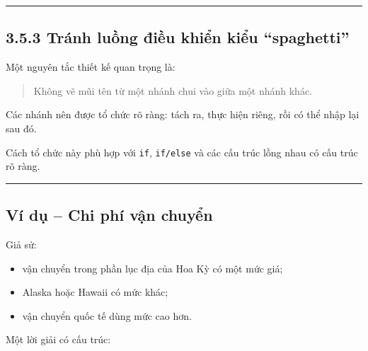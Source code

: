\documentclass[
  11pt,
  a4paper,
]{article}
\providecommand{\tightlist}{%
  \setlength{\itemsep}{0pt}\setlength{\parskip}{0pt}}
\begin{document}
\begin{center}\rule{0.5\linewidth}{0.5pt}\end{center}

\subsection{3.5.3 Tránh luồng điều khiển kiểu
``spaghetti''}\label{truxe1nh-luux1ed3ng-ux111iux1ec1u-khiux1ec3n-kiux1ec3u-spaghetti}

Một nguyên tắc thiết kế quan trọng là:

\begin{quote}
Không vẽ mũi tên từ một nhánh chui vào giữa một nhánh khác.
\end{quote}

Các nhánh nên được tổ chức rõ ràng: tách ra, thực hiện riêng, rồi có thể
nhập lại sau đó.

Cách tổ chức này phù hợp với \texttt{if}, \texttt{if/else} và các cấu
trúc lồng nhau có cấu trúc rõ ràng.

\begin{center}\rule{0.5\linewidth}{0.5pt}\end{center}

\subsection{Ví dụ -- Chi phí vận
chuyển}\label{vuxed-dux1ee5-chi-phuxed-vux1eadn-chuyux1ec3n}

Giả sử:

\begin{itemize}
\tightlist
\item
  vận chuyển trong phần lục địa của Hoa Kỳ có một mức giá;
\item
  Alaska hoặc Hawaii có mức khác;
\item
  vận chuyển quốc tế dùng mức cao hơn.
\end{itemize}

Một lời giải có cấu trúc:
\end{document}
